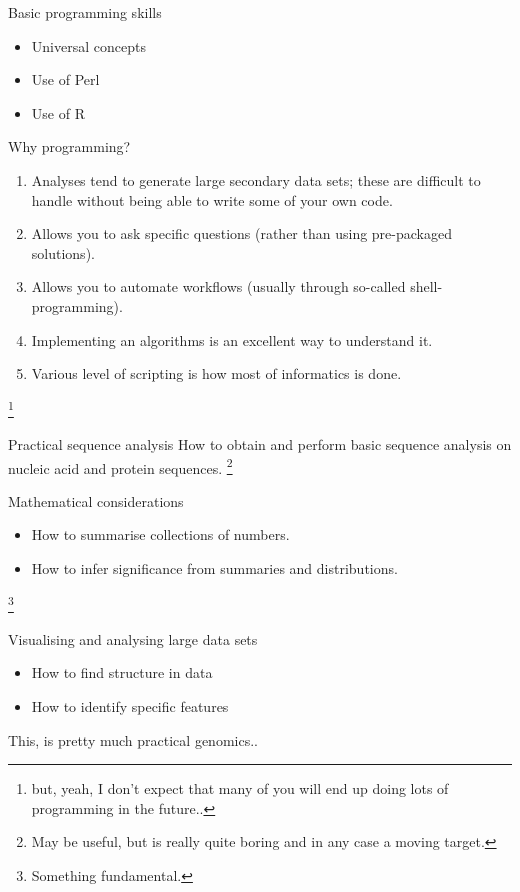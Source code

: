 \documentclass[pdf]{beamer}
\newcommand\blfootnote[1]{%
  \begingroup  %
  \renewcommand\thefootnote{}\footnote{#1}%
  \addtocounter{footnote}{-1}  %
  \endgroup
}
\begin{document}
\begin{frame}{Basic programming skills}
  \begin{itemize}
  \item Universal concepts
  \item Use of Perl
  \item Use of R
  \end{itemize}
\end{frame}

\begin{frame}{Why programming?}
  \begin{enumerate}
  \item Analyses tend to generate large secondary data sets; these are
    difficult to handle without being able to write some of your own code.
  \item Allows you to ask specific questions (rather than using pre-packaged
    solutions).
  \item Allows you to automate workflows (usually through so-called shell-programming).
  \item Implementing an algorithms is an excellent way to understand it.
  \item Various level of scripting is how most of informatics is done.
  \end{enumerate}
\blfootnote{but, yeah, I don't expect that many of you will end up doing lots
  of programming in the future..}
\end{frame}

\begin{frame}{Practical sequence analysis}
  How to obtain and perform basic sequence analysis on 
  nucleic acid and protein sequences.
  \blfootnote{May be useful, but is really quite boring and in any case a
    moving target.}
\end{frame}

\begin{frame}{Mathematical considerations}
  \begin{itemize}
    \item How to summarise collections of numbers.
    \item How to infer significance from summaries and distributions.
  \end{itemize}
  \blfootnote{Something fundamental.}
\end{frame}

\begin{frame}{Visualising and analysing large data sets}
  \begin{itemize}
    \item How to find structure in data
    \item How to identify specific features
  \end{itemize}
  This, is pretty much practical genomics..
\end{frame}
\end{document}
